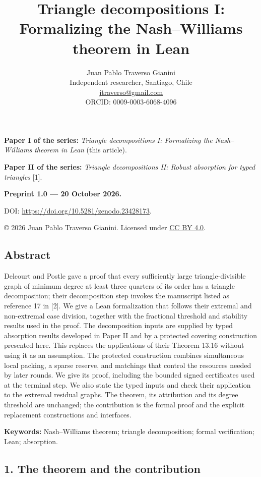 \documentclass[english,11pt,a4paper]{article}
\title{Triangle decompositions I: Formalizing the Nash–Williams theorem in Lean}
\author{Juan Pablo Traverso Gianini\\
\small Independent researcher, Santiago, Chile\\
\small \href{mailto:jtraverso@gmail.com}{jtraverso@gmail.com}\\
\small ORCID: 0009-0003-6068-4096}
\date{}
\begin{document}
\raggedbottom
\maketitle
\textbf{Paper I of the series:} \emph{Triangle decompositions I: Formalizing the Nash--Williams theorem in Lean} (this article).

\textbf{Paper II of the series:} \emph{Triangle decompositions II: Robust absorption for typed triangles} {[}1{]}.

\textbf{Preprint 1.0 --- 20 October 2026.}

DOI: \url{https://doi.org/10.5281/zenodo.23428173}.

© 2026 Juan Pablo Traverso Gianini. Licensed under \href{https://creativecommons.org/licenses/by/4.0/}{CC BY 4.0}.

\subsection{Abstract}\label{abstract}

Delcourt and Postle gave a proof that every sufficiently large triangle-divisible graph of minimum degree at least three quarters of its order has a triangle decomposition; their decomposition step invokes the manuscript listed as reference 17 in {[}2{]}. We give a Lean formalization that follows their extremal and non-extremal case division, together with the fractional threshold and stability results used in the proof. The decomposition inputs are supplied by typed absorption results developed in Paper II and by a protected covering construction presented here. This replaces the applications of their Theorem 13.16 without using it as an assumption. The protected construction combines simultaneous local packing, a sparse reserve, and matchings that control the resources needed by later rounds. We give its proof, including the bounded signed certificates used at the terminal step. We also state the typed inputs and check their application to the extremal residual graphs. The theorem, its attribution and its degree threshold are unchanged; the contribution is the formal proof and the explicit replacement constructions and interfaces.

\textbf{Keywords:} Nash--Williams theorem; triangle decomposition; formal verification; Lean; absorption.

\subsection{1. The theorem and the contribution}\label{the-theorem-and-the-contribution}
\end{document}
